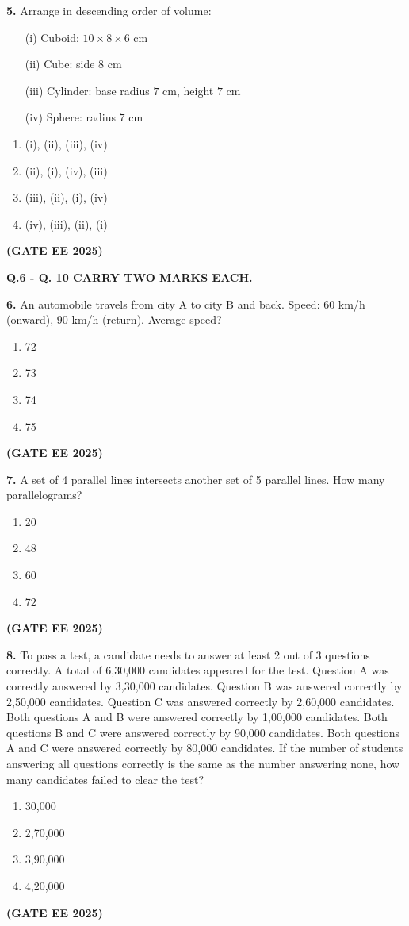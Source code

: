 \documentclass[journal,12pt,onecolumn]{IEEEtran}
\newcommand{\brak}[1]{(#1)}
\begin{document}
\noindent\textbf{5.} Arrange in descending order of volume:
\begin{enumerate}
    \item[\brak{i}] Cuboid: $10 \times 8 \times 6$ cm
    \item[\brak{ii}] Cube: side $8$ cm
    \item[\brak{iii}] Cylinder: base radius $7$ cm, height $7$ cm
    \item[\brak{iv}] Sphere: radius $7$ cm
\end{enumerate}
\begin{enumerate}
    \item \brak{i}, \brak{ii}, \brak{iii}, \brak{iv}
    \item \brak{ii}, \brak{i}, \brak{iv}, \brak{iii}
    \item \brak{iii}, \brak{ii}, \brak{i}, \brak{iv}
    \item \brak{iv}, \brak{iii}, \brak{ii}, \brak{i}
\end{enumerate}
\hfill \textbf{\brak{GATE EE 2025}}

\noindent\textbf{Q.6 - Q. 10 CARRY TWO MARKS EACH.}


\noindent\textbf{6.} An automobile travels from city A to city B and back. Speed: 60 km/h \brak{onward}, 90 km/h \brak{return}. Average speed?
\begin{enumerate}
    \item 72
    \item 73
    \item 74
    \item 75
\end{enumerate}
\hfill \textbf{\brak{GATE EE 2025}}

\noindent\textbf{7.} A set of 4 parallel lines intersects another set of 5 parallel lines. How many parallelograms?
\begin{enumerate}
    \item 20
    \item 48
    \item 60
    \item 72
\end{enumerate}
\hfill \textbf{\brak{GATE EE 2025}}

\noindent\textbf{8.} To pass a test, a candidate needs to answer at least 2 out of 3 questions correctly. A total of 6,30,000 candidates appeared for the test. Question A was correctly answered by 3,30,000 candidates. Question B was answered correctly by 2,50,000 candidates. Question C was answered correctly by 2,60,000 candidates. Both questions A and B were answered correctly by 1,00,000 candidates. Both questions B and C were answered correctly by 90,000 candidates. Both questions A and C were answered correctly by 80,000 candidates. If the number of students answering all questions correctly is the same as the number answering none, how many candidates failed to clear the test?
\begin{enumerate}
    \item 30,000
    \item 2,70,000
    \item 3,90,000
    \item 4,20,000
\end{enumerate}
\hfill \textbf{\brak{GATE EE 2025}}
\end{document}
